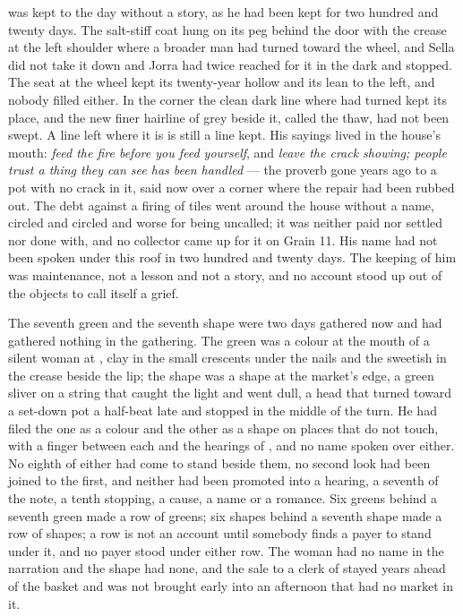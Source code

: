 \scenebreak

 was kept to the day without a story, as he had been kept for two hundred and twenty days. The salt-stiff coat hung on its peg behind the door with the crease at the left shoulder where a broader man had turned toward the wheel, and Sella did not take it down and Jorra had twice reached for it in the dark and stopped. The seat at the wheel kept its twenty-year hollow and its lean to the left, and nobody filled either. In the corner the clean dark line where  had turned kept its place, and the new finer hairline of grey beside it, called the thaw, had not been swept. A line left where it is is still a line kept. His sayings lived in the house's mouth: \emph{feed the fire before you feed yourself}, and \emph{leave the crack showing; people trust a thing they can see has been handled} --- the proverb gone years ago to a pot with no crack in it, said now over a corner where the repair had been rubbed out. The debt against a firing of tiles went around the house without a name, circled and circled and worse for being uncalled; it was neither paid nor settled nor done with, and no collector came up  for it on Grain 11. His name had not been spoken under this roof in two hundred and twenty days. The keeping of him was maintenance, not a lesson and not a story, and no account stood up out of the objects to call itself a grief.

The seventh green and the seventh shape were two days gathered now and had gathered nothing in the gathering. The green was a colour at the mouth of a silent woman at , clay in the small crescents under the nails and the sweetish  in the crease beside the lip; the shape was a shape at the market's edge, a green sliver on a string that caught the light and went dull, a head that turned toward a set-down pot a half-beat late and stopped in the middle of the turn. He had filed the one as a colour and the other as a shape on places that do not touch, with a finger between each and the hearings of , and no name spoken over either. No eighth of either had come to stand beside them, no second look had been joined to the first, and neither had been promoted into a hearing, a seventh of the note, a tenth stopping, a cause, a name or a romance. Six greens behind a seventh green made a row of greens; six shapes behind a seventh shape made a row of shapes; a row is not an account until somebody finds a payer to stand under it, and no payer stood under either row. The woman had no name in the narration and the shape had none, and the sale to a clerk of  stayed years ahead of the basket and was not brought early into an afternoon that had no market in it.

